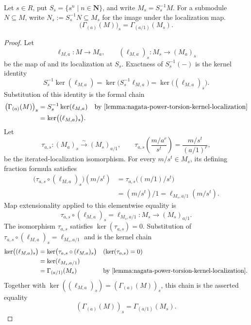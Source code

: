 \begin{lemma}
  \label{lemma:nagata-power-torsion-localization}
  \lean{}

  Let $s\in R$, put $S_s=\{s^n\mid n\in\mathbf N\}$, and write
  $M_s=S_s^{-1}M$.  For a submodule $N\subseteq M$, write
  $N_s:=S_s^{-1}N\subseteq M_s$ for the image under the localization map.
  \[
    \bigl(\Gamma_{(a)}(M)\bigr)_s
      =\Gamma_{(a/1)}(M_s).
  \]
\end{lemma}

\begin{proof}
  Let
  \[
    \ell_{M,a}\colon M\to M_a,
    \qquad
    (\ell_{M,a})_s\colon M_s\to(M_a)_s
  \]
  be the map of  and its
  localization at $S_s$.  Exactness of $S_s^{-1}(-)$ is the kernel identity
  \[
    S_s^{-1}\ker(\ell_{M,a})
      =\ker\bigl(S_s^{-1}\ell_{M,a}\bigr)
      =\ker\bigl((\ell_{M,a})_s\bigr).
  \]
  Substitution of this identity is the formal chain
  \[
  \begin{aligned}
    \bigl(\Gamma_{(a)}(M)\bigr)_s
      &=S_s^{-1}\ker(\ell_{M,a})
        &&\text{by \Cref{lemma:nagata-power-torsion-kernel-localization}}\\
      &=\ker\bigl((\ell_{M,a})_s\bigr).
  \end{aligned}
  \]
  Let
  \[
    \tau_{a,s}\colon(M_a)_s\xrightarrow{\sim}(M_s)_{a/1},
    \qquad
    \tau_{a,s}\!\left(\frac{m/a^r}{s^t}\right)
       =\frac{m/s^t}{(a/1)^r},
  \]
  be the iterated-localization isomorphism.  For every $m/s^t\in M_s$, its
  defining fraction formula satisfies
  \[
  \begin{aligned}
    \bigl(\tau_{a,s}\circ(\ell_{M,a})_s\bigr)(m/s^t)
      &=\tau_{a,s}\bigl((m/1)/s^t\bigr)\\
      &=(m/s^t)/1
       =\ell_{M_s,a/1}(m/s^t).
  \end{aligned}
  \]
  Map extensionality applied to this elementwise equality is
  \[
    \tau_{a,s}\circ(\ell_{M,a})_s
      =\ell_{M_s,a/1}\colon M_s\longrightarrow(M_s)_{a/1}.
  \]
  The isomorphism $\tau_{a,s}$ satisfies
  $\ker(\tau_{a,s})=0$.  Substitution of
  $\tau_{a,s}\circ(\ell_{M,a})_s=\ell_{M_s,a/1}$ and
   is the kernel chain
  \[
  \begin{aligned}
    \ker\bigl((\ell_{M,a})_s\bigr)
      &=\ker\bigl(\tau_{a,s}\circ(\ell_{M,a})_s\bigr)
        &&(\ker(\tau_{a,s})=0)\\
      &=\ker(\ell_{M_s,a/1})\\
      &=\Gamma_{(a/1)}(M_s)
        &&\text{by \Cref{lemma:nagata-power-torsion-kernel-localization}}.
  \end{aligned}
  \]
  Together with
  $\ker((\ell_{M,a})_s)=(\Gamma_{(a)}(M))_s$, this chain is the asserted
  equality
  \[
    (\Gamma_{(a)}(M))_s=\Gamma_{(a/1)}(M_s).
  \]
\end{proof}

